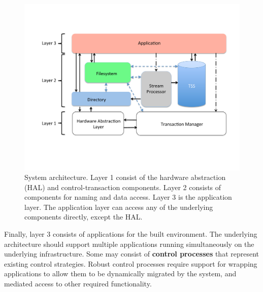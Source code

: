 \begin{figure}[htb]
\centering
\includegraphics[width=\columnwidth]{figs/arch-layered}
\caption{System architecture.  Layer 1 consist of the hardware abstraction (HAL) and control-transaction components.  Layer 2 consists of components for naming and data access.  Layer 3 is the application layer.  The application layer can access
any of the underlying components directly, except the HAL.}
\label{fig:arch-layered}
\end{figure}

Finally, layer 3 consists of applications for the built environment.  The underlying architecture should support multiple applications running simultaneously on the underlying infrastructure.  Some may consist of {\bf control processes} that represent existing control strategies.  Robust control processes require support for wrapping applications to allow them to be dynamically migrated by the system, and mediated access to other required functionality.


